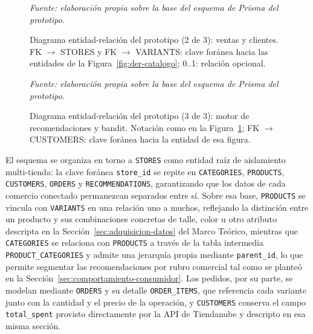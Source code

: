 \begin{figure}[!htbp]
    \centering
    
    \caption{Diagrama entidad-relación del prototipo (2 de 3): ventas y clientes. FK $\rightarrow$ STORES y FK $\rightarrow$ VARIANTS: clave foránea hacia las entidades de la Figura~\ref{fig:der-catalogo}; 0..1: relación opcional.}
    \label{fig:der-ventas}

    \smallskip
    \noindent\textit{Fuente: elaboración propia sobre la base del esquema de Prisma del prototipo.}
\end{figure}

\begin{figure}[!htbp]
    \centering
    
    \caption{Diagrama entidad-relación del prototipo (3 de 3): motor de recomendaciones y bandit. Notación como en la Figura~\ref{fig:der-ventas}; FK $\rightarrow$ CUSTOMERS: clave foránea hacia la entidad de esa figura.}
    \label{fig:der-motor}

    \smallskip
    \noindent\textit{Fuente: elaboración propia sobre la base del esquema de Prisma del prototipo.}
\end{figure}

El esquema se organiza en torno a \texttt{STORES} como entidad raíz de aislamiento multi-tienda: la clave foránea \texttt{store\_id} se repite en \texttt{CATEGORIES}, \texttt{PRODUCTS}, \texttt{CUSTOMERS}, \texttt{ORDERS} y \texttt{RECOMMENDATIONS}, garantizando que los datos de cada comercio conectado permanezcan separados entre sí. Sobre esa base, \texttt{PRODUCTS} se vincula con \texttt{VARIANTS} en una relación uno a muchos, reflejando la distinción entre un producto y sus combinaciones concretas de talle, color u otro atributo descripta en la Sección~\ref{sec:adquisicion-datos} del Marco Teórico, mientras que \texttt{CATEGORIES} se relaciona con \texttt{PRODUCTS} a través de la tabla intermedia \texttt{PRODUCT\_CATEGORIES} y admite una jerarquía propia mediante \texttt{parent\_id}, lo que permite segmentar las recomendaciones por rubro comercial tal como se planteó en la Sección~\ref{sec:comportamiento-consumidor}. Los pedidos, por su parte, se modelan mediante \texttt{ORDERS} y su detalle \texttt{ORDER\_ITEMS}, que referencia cada variante junto con la cantidad y el precio de la operación, y \texttt{CUSTOMERS} conserva el campo \texttt{total\_spent} provisto directamente por la API de Tiendanube y descripto en esa misma sección.

